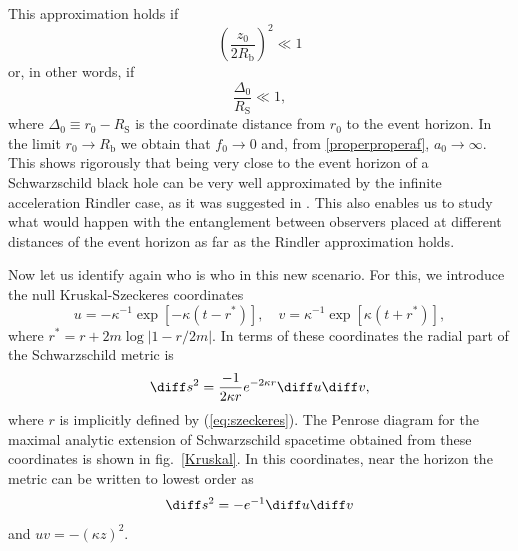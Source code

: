 This approximation holds if
\begin{equation}\label{conditioaproximatio}
\left(\frac{z_0}{2R_{\text{b}}}\right)^2\ll1
\end{equation}
or, in other words, if
\begin{equation}\label{conditioaproximatio2}
\frac{\Delta_0}{R_\text{S}}\ll1,
\end{equation}
where $\Delta_0\equiv r_0-R_\text{S}$ is the coordinate distance from $r_0$ to
the event horizon. In the limit $r_0\rightarrow R_{\text{b}}$ we obtain
that $f_0\rightarrow0$ and, from \eqref{properproperaf},
$a_0\rightarrow\infty$. This shows rigorously that being very close to
the event horizon of a Schwarzschild black hole can be very well
approximated by the infinite acceleration Rindler case, as it was
suggested in \cite{Alicefalls,AlsingSchul}. This also enables us
to study what would happen  with the entanglement between observers
placed at different distances of the event horizon as far as the Rindler
approximation holds.

Now let us identify again who is who in this new scenario. For this, we
introduce the null Kruskal-Szeckeres coordinates
\begin{equation}\label{eq:szeckeres}
u=-\kappa^{-1}\exp[-\kappa (t-r^*)],\quad v=\kappa^{-1}\exp[\kappa (t+r^*)],
\end{equation}
where $r^*=r+2m\log|1-r/2m|$. In terms of these coordinates the radial
part of the Schwarzschild metric is
\begin{equation}
\diff s^2=\frac{-1}{2\kappa r}e^{-2\kappa r}\diff u\diff v,
\end{equation}
where $r$ is implicitly defined by (\ref{eq:szeckeres}). The Penrose
diagram for the maximal analytic extension of Schwarzschild spacetime obtained from these coordinates is shown in fig.~\ref{Kruskal}. In this coordinates, 
near the horizon the metric can be written to  lowest order as
\begin{equation}
\diff s^2=-e^{-1}\diff u \diff v
\end{equation}
and $uv=-(\kappa z)^2$.

